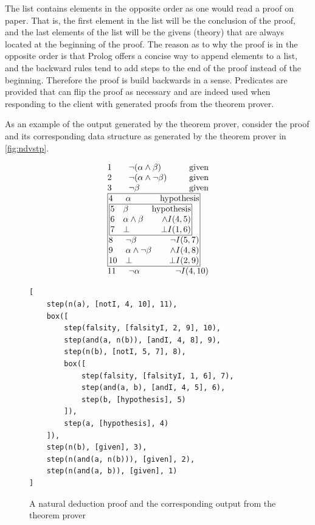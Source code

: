 \documentclass[11pt,twoside,a4paper]{report}
\begin{document}
The list contains elements in the opposite order as one would read a proof on paper. That is, the first element in the list will be the conclusion of the proof, and the last elements of the list will be the givens (theory) that are always located at the beginning of the proof. The reason as to why the proof is in the opposite order is that Prolog offers a concise way to append elements to a list, and the backward rules tend to add steps to the end of the proof instead of the beginning. Therefore the proof is build backwards in a sense. Predicates are provided that can flip the proof as necessary and are indeed used when responding to the client with generated proofs from the theorem prover.

As an example of the output generated by the theorem prover, consider the proof and its corresponding data structure as generated by the theorem prover in \autoref{fig:ndvstp}.

\begin{figure}[htp]
\begin{minipage}[c]{.35\linewidth}
\[\vbox{\offinterlineskip\halign{
&\tabskip=1.5em#\strut&$#$\hfil\tabskip=1em&\hfil$#$\tabskip=0em\cr
%
1&\neg(\alpha\wedge\beta)&\mbox{given}\cr
2&\neg(\alpha\wedge\neg\beta)&\mbox{given}\cr
3&\neg\beta&\mbox{given}\cr
%
\multispan3\vbox{\halign{
\vrule#&&\hskip.1em\tabskip=1em#\strut&$#$\hfil\tabskip=1em&\hfil$#$\hskip0.1em\tabskip=0em&\vrule#\cr
\noalign{\hrule}
%
&4&\alpha&\mbox{hypothesis}&\cr
%
&\multispan3\,\vbox{\halign{
\vrule#&&\hskip.1em\tabskip=1em#\strut&$#$\hfil\tabskip=1em&\hfil$#$\hskip0.1em\tabskip=0em&\vrule#\cr
\noalign{\hrule}
%
&5&\beta&\mbox{hypothesis}&\cr
&6&\alpha\wedge\beta&\wedge I(4,5)&\cr
&7&\bot&\bot I(1,6)&\cr
%
\noalign{\hrule}}}\,&\cr
%
&8&\neg\beta&\neg I(5,7)&\cr
&9&\alpha\wedge\neg\beta&\wedge I(4,8)&\cr
&10&\bot&\bot I(2,9)&\cr
%
\noalign{\hrule}}}\,\cr
%
11&\neg\alpha&\neg I(4,10)\cr
}}\]
\end{minipage}%
\begin{minipage}[c]{.65\linewidth}
\begin{lstlisting}
[
	step(n(a), [notI, 4, 10], 11),
	box([
		step(falsity, [falsityI, 2, 9], 10),
		step(and(a, n(b)), [andI, 4, 8], 9),
		step(n(b), [notI, 5, 7], 8),
		box([
			step(falsity, [falsityI, 1, 6], 7),
			step(and(a, b), [andI, 4, 5], 6),
			step(b, [hypothesis], 5)
		]),
		step(a, [hypothesis], 4)
	]),
	step(n(b), [given], 3),
	step(n(and(a, n(b))), [given], 2),
	step(n(and(a, b)), [given], 1)
]
\end{lstlisting}
\end{minipage}
\caption{A natural deduction proof and the corresponding output from the theorem prover\label{fig:ndvstp}}
\end{figure}
\end{document}
